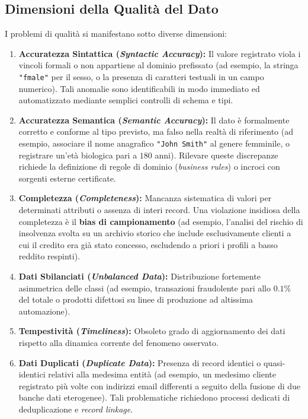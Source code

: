 \subsection{Dimensioni della Qualità del Dato}
I problemi di qualità si manifestano sotto diverse dimensioni:
\begin{enumerate}
    \item \textbf{Accuratezza Sintattica (\textit{Syntactic Accuracy}):} Il valore registrato viola i vincoli formali o non appartiene al dominio prefissato (ad esempio, la stringa \texttt{"fmale"} per il sesso, o la presenza di caratteri testuali in un campo numerico). Tali anomalie sono identificabili in modo immediato ed automatizzato mediante semplici controlli di schema e tipi.
    \item \textbf{Accuratezza Semantica (\textit{Semantic Accuracy}):} Il dato è formalmente corretto e conforme al tipo previsto, ma falso nella realtà di riferimento (ad esempio, associare il nome anagrafico \texttt{"John Smith"} al genere femminile, o registrare un'età biologica pari a $180$ anni). Rilevare queste discrepanze richiede la definizione di regole di dominio (\textit{business rules}) o incroci con sorgenti esterne certificate.
    \item \textbf{Completezza (\textit{Completeness}):} Mancanza sistematica di valori per determinati attributi o assenza di interi record. Una violazione insidiosa della completezza è il \textbf{bias di campionamento} (ad esempio, l'analisi del rischio di insolvenza svolta su un archivio storico che include esclusivamente clienti a cui il credito era già stato concesso, escludendo a priori i profili a basso reddito respinti).
    \item \textbf{Dati Sbilanciati (\textit{Unbalanced Data}):} Distribuzione fortemente asimmetrica delle classi (ad esempio, transazioni fraudolente pari allo $0.1\%$ del totale o prodotti difettosi su linee di produzione ad altissima automazione).
    \item \textbf{Tempestività (\textit{Timeliness}):} Obsoleto grado di aggiornamento dei dati rispetto alla dinamica corrente del fenomeno osservato.
    \item \textbf{Dati Duplicati (\textit{Duplicate Data}):} Presenza di record identici o quasi-identici relativi alla medesima entità (ad esempio, un medesimo cliente registrato più volte con indirizzi email differenti a seguito della fusione di due banche dati eterogenee). Tali problematiche richiedono processi dedicati di deduplicazione e \textit{record linkage}.
\end{enumerate}

